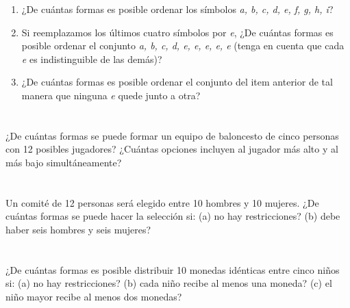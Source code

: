 \documentclass[a4paper,11pt]{article}
\begin{document}
\begin{enumerate}[label=(\alph*),
                  leftmargin=2\parindent,
                  rightmargin=2\parindent]

    \item{
        ¿De cuántas formas es posible ordenar los símbolos
        \emph{a, b, c, d, e, f, g, h, i}?
    }

    \item{
        Si reemplazamos los últimos cuatro símbolos por \emph{e},
        ¿De cuántas formas es posible ordenar el conjunto
        \emph{a, b, c, d, e, e, e, e, e} (tenga en cuenta que cada \emph{e} es
        indistinguible de las demás)?
    }

    \item{
        ¿De cuántas formas es posible ordenar el conjunto del item anterior de tal
        manera que ninguna \emph{e} quede junto a otra?
    }

\end{enumerate}


\section{}

¿De cuántas formas se puede formar un equipo de baloncesto de cinco personas con 12
posibles jugadores? ¿Cuántas opciones incluyen al jugador más alto y al más bajo
simultáneamente?


\section{}

Un comité de 12 personas será elegido entre 10 hombres y 10 mujeres. ¿De cuántas formas
se puede hacer la selección si:
(a) no hay restricciones?
(b) debe haber seis hombres y seis mujeres?


\section{}

¿De cuántas formas es posible distribuir 10 monedas idénticas entre cinco niños si:
(a) no hay restricciones?
(b) cada niño recibe al menos una moneda?
(c) el niño mayor recibe al menos dos monedas?

\section{}
\end{document}

